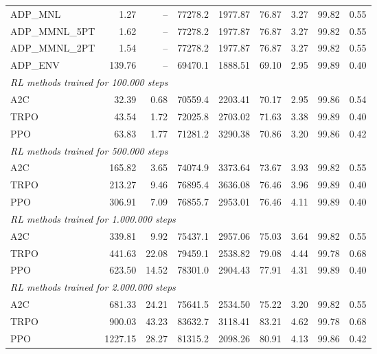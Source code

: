 \begin{samepage}
\begin{center}
\begin{tabular}{l|rr|rr|rr|rr}
    \midrule
    ADP\_MNL     &     1.27 &    -- &    77278.2 &    1977.87 &   76.87 &    3.27 &   99.82 &    0.55 \\
    ADP\_MMNL\_5PT &     1.62 &    -- &    77278.2 &    1977.87 &   76.87 &    3.27 &   99.82 &    0.55 \\
    ADP\_MMNL\_2PT &     1.54 &    -- &    77278.2 &    1977.87 &   76.87 &    3.27 &   99.82 &    0.55 \\
    ADP\_ENV     &   139.76 &    -- &    69470.1 &    1888.51 &   69.10 &    2.95 &   99.89 &    0.40 \\
    \midrule
    \multicolumn{9}{l}{\textit{RL methods trained for 100.000 steps}} \\
    \midrule
    A2C          &    32.39 &     0.68 &    70559.4 &    2203.41 &   70.17 &    2.95 &   99.86 &    0.54 \\
    TRPO         &    43.54 &     1.72 &    72025.8 &    2703.02 &   71.63 &    3.38 &   99.89 &    0.40 \\
    PPO          &    63.83 &     1.77 &    71281.2 &    3290.38 &   70.86 &    3.20 &   99.86 &    0.42 \\
    \midrule
    \multicolumn{9}{l}{\textit{RL methods trained for 500.000 steps}} \\
    \midrule
    A2C          &   165.82 &     3.65 &    74074.9 &    3373.64 &   73.67 &    3.93 &   99.82 &    0.55 \\
    TRPO         &   213.27 &     9.46 &    76895.4 &    3636.08 &   76.46 &    3.96 &   99.89 &    0.40 \\
    PPO          &   306.91 &     7.09 &    76855.7 &    2953.01 &   76.46 &    4.11 &   99.89 &    0.40 \\
    \midrule
    \multicolumn{9}{l}{\textit{RL methods trained for 1.000.000 steps}} \\
    \midrule
    A2C          &   339.81 &     9.92 &    75437.1 &    2957.06 &   75.03 &    3.64 &   99.82 &    0.55 \\
    TRPO         &   441.63 &    22.08 &    79459.1 &    2538.82 &   79.08 &    4.44 &   99.78 &    0.68 \\
    PPO          &   623.50 &    14.52 &    78301.0 &    2904.43 &   77.91 &    4.31 &   99.89 &    0.40 \\
    \midrule
    \multicolumn{9}{l}{\textit{RL methods trained for 2.000.000 steps}} \\
    \midrule
    A2C          &   681.33 &    24.21 &    75641.5 &    2534.50 &   75.22 &    3.20 &   99.82 &    0.55 \\
    TRPO         &   900.03 &    43.23 &    83632.7 &    3118.41 &   83.21 &    4.62 &   99.78 &    0.68 \\
    PPO          &  1227.15 &    28.27 &    81315.2 &    2098.26 &   80.91 &    4.13 &   99.86 &    0.42 \\
    \bottomrule
  \end{tabular}
\end{center}
\end{samepage}


